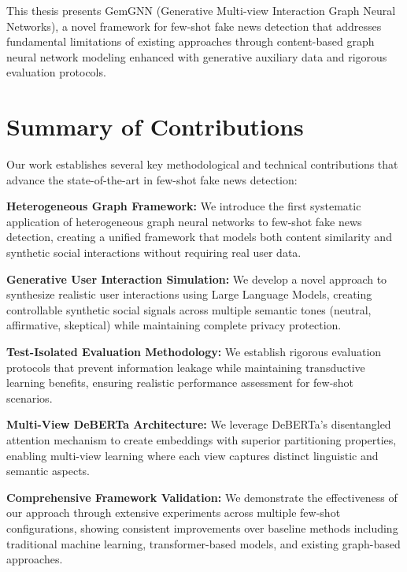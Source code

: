
This thesis presents GemGNN (Generative Multi-view Interaction Graph Neural Networks), a novel framework for few-shot fake news detection that addresses fundamental limitations of existing approaches through content-based graph neural network modeling enhanced with generative auxiliary data and rigorous evaluation protocols.

\section{Summary of Contributions}

Our work establishes several key methodological and technical contributions that advance the state-of-the-art in few-shot fake news detection:

\textbf{Heterogeneous Graph Framework:} We introduce the first systematic application of heterogeneous graph neural networks to few-shot fake news detection, creating a unified framework that models both content similarity and synthetic social interactions without requiring real user data.

\textbf{Generative User Interaction Simulation:} We develop a novel approach to synthesize realistic user interactions using Large Language Models, creating controllable synthetic social signals across multiple semantic tones (neutral, affirmative, skeptical) while maintaining complete privacy protection.

\textbf{Test-Isolated Evaluation Methodology:} We establish rigorous evaluation protocols that prevent information leakage while maintaining transductive learning benefits, ensuring realistic performance assessment for few-shot scenarios.

\textbf{Multi-View DeBERTa Architecture:} We leverage DeBERTa's disentangled attention mechanism to create embeddings with superior partitioning properties, enabling multi-view learning where each view captures distinct linguistic and semantic aspects.

\textbf{Comprehensive Framework Validation:} We demonstrate the effectiveness of our approach through extensive experiments across multiple few-shot configurations, showing consistent improvements over baseline methods including traditional machine learning, transformer-based models, and existing graph-based approaches.

